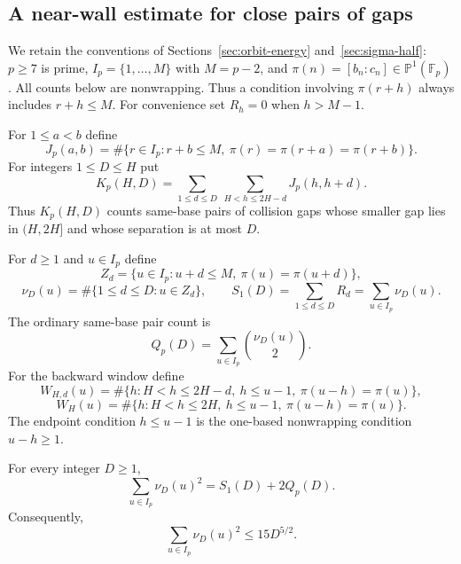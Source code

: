 
\subsection{A near-wall estimate for close pairs of gaps}
\label{sec:nw-near-wall}

We retain the conventions of Sections~\ref{sec:orbit-energy}
and~\ref{sec:sigma-half}: $p\ge7$ is prime,
$I_p=\{1,\ldots,M\}$ with $M=p-2$, and
$\pi(n)=[b_n:c_n]\in\mathbb P^1(\mathbb F_p)$.
All counts below are nonwrapping.  Thus a condition involving
$\pi(r+h)$ always includes $r+h\le M$.  For convenience set $R_h=0$
when $h>M-1$.

For $1\le a<b$ define
\[
 J_p(a,b)
 =\#\{r\in I_p:r+b\le M,
          \ \pi(r)=\pi(r+a)=\pi(r+b)\}.
\]
For integers $1\le D\le H$ put
\begin{equation}\label{eq:nw-K-def}
 K_p(H,D)
 =\sum_{1\le d\le D}\ \sum_{H<h\le2H-d}J_p(h,h+d).
\end{equation}
Thus $K_p(H,D)$ counts same-base pairs of collision gaps whose smaller
gap lies in $(H,2H]$ and whose separation is at most $D$.

For $d\ge1$ and $u\in I_p$ define
\[
 Z_d=\{u\in I_p:u+d\le M,\ \pi(u)=\pi(u+d)\},
\]
\[
 \nu_D(u)
 =\#\{1\le d\le D:u\in Z_d\},
 \qquad
 S_1(D)=\sum_{1\le d\le D}R_d=\sum_{u\in I_p}\nu_D(u).
\]
The ordinary same-base pair count is
\begin{equation}\label{eq:nw-Q-def}
 Q_p(D)=\sum_{u\in I_p}\binom{\nu_D(u)}2.
\end{equation}
For the backward window define
\[
 W_{H,d}(u)
 =\#\{h:H<h\le2H-d,\ h\le u-1,
          \ \pi(u-h)=\pi(u)\},
\]
\begin{equation}\label{eq:nw-W-def}
 W_H(u)
 =\#\{h:H<h\le2H,\ h\le u-1,
          \ \pi(u-h)=\pi(u)\}.
\end{equation}
The endpoint condition $h\le u-1$ is the one-based nonwrapping condition
$u-h\ge1$.

\begin{lemma}
\label{thm:nw-nu-identity}
For every integer $D\ge1$,
\begin{equation}\label{eq:nw-nu-identity}
 \sum_{u\in I_p}\nu_D(u)^2=S_1(D)+2Q_p(D).
\end{equation}
Consequently,
\begin{equation}\label{eq:nw-nu-L2}
 \sum_{u\in I_p}\nu_D(u)^2\le15D^{5/2}.
\end{equation}
\end{lemma}

